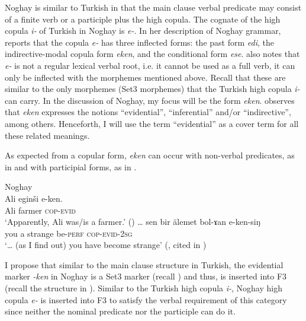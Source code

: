 \documentclass[output=paper]{langsci/langscibook}
\begin{document}
Noghay is similar to Turkish in that the main clause verbal predicate may consist of a finite verb or a participle plus the high copula. 
The cognate of the high copula \textit{i-} of Turkish in Noghay is \textit{e-}. 
In her description of Noghay grammar, \citet{Karakoc2001} reports that the copula \textit{e-} has three inflected forms: 
the past form \textit{edi}, 
the indirective-modal copula form \textit{eken}, 
and the conditional form \textit{ese}. 
\citet{Karakoc2001} also notes that \textit{e-} is not a regular lexical verbal root, i.e. it cannot be used as a full verb, 
it can only be inflected with the morphemes mentioned above. 
Recall that these are similar to the only morphemes (Set3 morphemes) that the Turkish high copula \textit{i-} can carry. 
In the discussion of Noghay, my focus will be the form \textit{eken}. 
\citet{Karakoc2001} observes that \textit{eken} expresses the notions ``evidential'', ``inferential'' and/or ``indirective'', among others. 
Henceforth, I will use the term ``evidential'' as a cover term for all these related meanings. 

As expected from a copular form, \textit{eken} can occur with non-verbal predicates, as in  
and with participial forms, as in . 

\ea Noghay\\%
    \label{kelepirex:key:16}
    \ea 
        \label{kelepirex:key:16a}
        \gll Ali eginši e-ken. \\
        Ali farmer \textsc{cop}-\textsc{evid} \\
        \glt `Apparently, Ali was/is a farmer.' (\citealp[23]{Karakoc2001})
    \ex 
        \label{kelepirex:key:16b}
        \gll \ldots{} sen bir älemet bol-ɤan e-ken-siŋ \\
        {} you a strange be-\textsc{perf} \textsc{cop}-\textsc{evid}-\textsc{2sg}\\
        \glt `\ldots{} (as I find out) you have become strange' (\citealp[33]{Kazakov1983}, cited in \citealp[25]{Karakoc2001})
    \z
\z  

I propose that similar to the main clause structure in Turkish, the evidential marker \textit{-ken} in Noghay is a Set3 marker (recall ) and thus, is inserted into F3 (recall the structure in ). 
Similar to the Turkish high copula \textit{i-}, Noghay high copula \textit{e-} is inserted into F3 to satisfy the verbal requirement of this category since neither the nominal predicate  nor the participle  can do it.  
\end{document}
